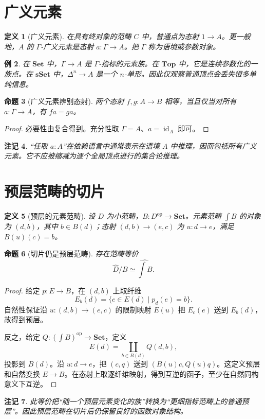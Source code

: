 \documentclass[12pt,oneside,openany,fontset=none]{ctexbook}
\theoremstyle{cn}
\newtheorem{definition}{定义}[chapter]
\newtheorem{example}[definition]{例}
\newtheorem{proposition}[definition]{命题}
\newtheorem{remark}[definition]{注记}
\numberwithin{equation}{chapter}
\newcommand{\Set}{\mathbf{Set}}
\newcommand{\Top}{\mathbf{Top}}
\newcommand{\sSet}{\mathbf{sSet}}
\newcommand{\id}{\operatorname{id}}
\newcommand{\op}{\mathrm{op}}
\begin{document}
\section{广义元素}
\begin{definition}[广义元素]
在具有终对象的范畴 $C$ 中，普通点为态射 $1\to A$。更一般地，$A$ 的 $\Gamma$-广义元素是态射 $a:\Gamma\to A$。把 $\Gamma$ 称为语境或参数对象。
\end{definition}
\begin{example}
在 $\Set$ 中，$\Gamma\to A$ 是 $\Gamma$-指标的元素族。在 $\Top$ 中，它是连续参数化的一族点。在 $\sSet$ 中，$\Delta^n\to A$ 是一个 $n$-单形。因此仅观察普通顶点会丢失很多单纯信息。
\end{example}
\begin{proposition}[广义元素辨别态射]
两个态射 $f,g:A\to B$ 相等，当且仅当对所有 $a:\Gamma\to A$，有 $fa=ga$。
\end{proposition}
\begin{proof}
必要性由复合得到。充分性取 $\Gamma=A$、$a=\id_A$ 即可。
\end{proof}
\begin{remark}
“任取 $a:A$”在依赖语言中通常表示在语境 $A$ 中推理，因而包括所有广义元素。它不应被缩减为逐个全局顶点进行的集合论推理。
\end{remark}

\section{预层范畴的切片}
\begin{definition}[预层的元素范畴]
设 $D$ 为小范畴，$B:D^\op\to\Set$。元素范畴 $\int B$ 的对象为 $(d,b)$，其中 $b\in B(d)$；态射 $(d,b)\to(e,c)$ 为 $u:d\to e$，满足 $B(u)(c)=b$。
\end{definition}
\begin{proposition}[切片仍是预层范畴]
存在范畴等价
\[
\widehat D/B\simeq\widehat{\int B}.
\]
\end{proposition}
\begin{proof}
给定 $p:E\to B$，在 $(d,b)$ 上取纤维
\[
E_b(d)=\{e\in E(d)\mid p_d(e)=b\}.
\]
自然性保证沿 $u:(d,b)\to(e,c)$ 的限制映射 $E(u)$ 把 $E_c(e)$ 送到 $E_b(d)$，故得到预层。

反之，给定 $Q:(\int B)^\op\to\Set$，定义
\[
E(d)=\coprod_{b\in B(d)}Q(d,b),
\]
投影到 $B(d)$。沿 $u:d\to e$，把 $(c,q)$ 送到 $(B(u)c,Q(u)q)$。这定义预层和自然变换 $E\to B$。在态射上取逐纤维映射，得到互逆的函子，至少在自然同构意义下互逆。
\end{proof}
\begin{remark}
此等价把“随一个预层元素变化的族”转换为“更细指标范畴上的普通预层”。因此预层范畴在切片后仍保留良好的函数对象结构。
\end{remark}
\end{document}
